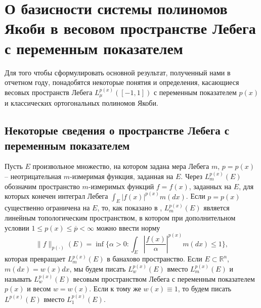 \chapter{О базисности системы  полиномов Якоби в весовом пространстве Лебега с переменным показателем}

Для того чтобы сформулировать основной результат, полученный нами в отчетном году, понадобятся некоторые понятия и определения, касающиеся весовых пространств Лебега $L^{p(x)}_\mu([-1,1])$ с переменным показателем $p(x)$ и классических ортогональных полиномов Якоби.


\section{Некоторые сведения о пространстве Лебега с переменным показателем }

Пусть $E$ произвольное
множество, на котором задана мера Лебега $m$, $p=p(x)$ -- неотрицательная $m$-измеримая  функция, заданная на $E$. Через $L^{p(x)}_m(E)$ обозначим пространство $m$-измеримых функций $f=f(x)$, заданных на $E$,  для которых конечен интеграл Лебега $\int_E|f(x)|^{p(x)}m(dx)$.  Если $p=p(x)$ существенно ограничена на $E$, то, как показано в \cite{ShIIBJWShar4}, $L^{p(x)}_m(E)$ является линейным топологическим пространством, в котором при дополнительном условии $1\le p(x)\le \overline{p}<\infty$ можно ввести норму
\begin{equation}\label{2.1}
\|f\|_{p(\cdot)}(E)=\inf\{\alpha>0: \int_E\left|\frac{f(x)}{\alpha}\right|^{p(x)}m(dx)\le1\},
\end{equation}
которая превращает $L^{p(x)}_m(E)$ в банахово пространство. Если $E \subset \mathbb{R}^n$, $m(dx)=w(x)dx$, мы будем писать  $L^{p(x)}_w(E)$ вместо $L^{p(x)}_m(E)$ и называть $L^{p(x)}_w(E)$ весовым пространством Лебега с переменным показателем $p(x)$ и весом $w=w(x)$. Если к тому же $w(x)\equiv 1$, то будем писать $L^{p(x)}(E)$ вместо $L^{p(x)}_1(E)$.

